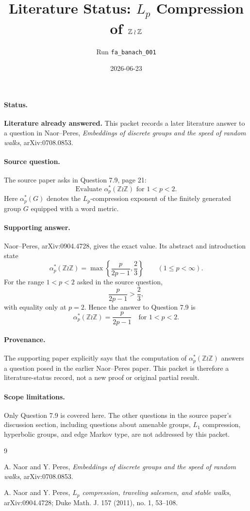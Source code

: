 \documentclass[11pt]{article}
\title{Literature Status: \(L_p\) Compression of \(\Z \bwr \Z\)}
\author{Run \texttt{fa\_banach\_001}}
\date{2026-06-23}
\newcommand{\Z}{\mathbb{Z}}
\newcommand{\bwr}{\wr}
\begin{document}
\sloppy
\maketitle

\paragraph{Status.}
\textbf{Literature already answered.} This packet records a later literature
answer to a question in Naor--Peres, \emph{Embeddings of discrete groups and
the speed of random walks}, arXiv:0708.0853.

\paragraph{Source question.}
The source paper asks in Question 7.9, page 21:
\[
\text{Evaluate } \alpha_p^*(\Z \bwr \Z) \text{ for } 1<p<2.
\]
Here \(\alpha_p^*(G)\) denotes the \(L_p\)-compression exponent of the finitely
generated group \(G\) equipped with a word metric.

\paragraph{Supporting answer.}
Naor--Peres, arXiv:0904.4728, gives the exact value. Its abstract and
introduction state
\[
\alpha_p^*(\Z \bwr \Z)=
\max\left\{\frac{p}{2p-1},\frac23\right\}
\qquad (1\le p<\infty).
\]
For the range \(1<p<2\) asked in the source question,
\[
\frac{p}{2p-1}>\frac23,
\]
with equality only at \(p=2\). Hence the answer to Question 7.9 is
\[
\boxed{\alpha_p^*(\Z \bwr \Z)=\frac{p}{2p-1}\quad\text{for }1<p<2.}
\]

\paragraph{Provenance.}
The supporting paper explicitly says that the computation of
\(\alpha_p^*(\Z \bwr \Z)\) answers a question posed in the earlier
Naor--Peres paper. This packet is therefore a literature-status record, not a
new proof or original partial result.

\paragraph{Scope limitations.}
Only Question 7.9 is covered here. The other questions in the source paper's
discussion section, including questions about amenable groups, \(L_1\)
compression, hyperbolic groups, and edge Markov type, are not addressed by this
packet.

\begin{thebibliography}{9}

A. Naor and Y. Peres,
\emph{Embeddings of discrete groups and the speed of random walks},
arXiv:0708.0853.

A. Naor and Y. Peres,
\emph{\(L_p\) compression, traveling salesmen, and stable walks},
arXiv:0904.4728; Duke Math. J. 157 (2011), no. 1, 53--108.

\end{thebibliography}
\end{document}
